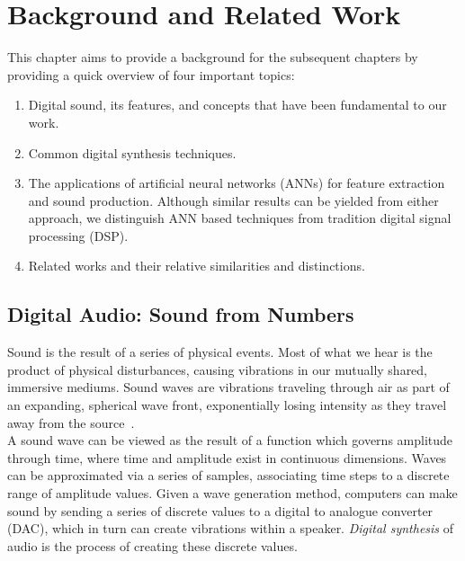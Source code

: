 \documentclass[\main/thesis.tex]{subfiles}
\begin{document}
\chapter{Background and Related Work}
\label{section:background}
This chapter aims to provide a background for the subsequent chapters by providing a quick overview of four important topics:\\ 
\begin{enumerate}[label=(\roman*)]
\item Digital sound, its features, and concepts that have been fundamental to our work.
\item Common digital synthesis techniques.
\item The applications of artificial neural networks (ANNs) for feature extraction and sound production. Although similar results can be yielded from either approach, we distinguish ANN based techniques from tradition digital signal processing (DSP).
\item Related works and their relative similarities and distinctions.
\end{enumerate}
\section{Digital Audio: Sound from Numbers}
\label{sec:digital_audio}
Sound is the result of a series of physical events. Most of what we hear is the product of physical disturbances, causing vibrations in our mutually shared, immersive mediums. Sound waves are vibrations traveling through air as part of an expanding, spherical wave front, exponentially losing intensity as they travel away from the source~\cite{cook1999chap4}. 
\\

A sound wave can be viewed as the result of a function which governs amplitude through time, where time and amplitude exist in continuous dimensions. Waves can be approximated via a series of samples, associating time steps to a discrete range of amplitude values. 
Given a wave generation method, computers can make sound by sending a series of discrete values to a digital to analogue converter (DAC), which in turn can
create vibrations within a speaker.  \textit{Digital synthesis} of audio is the process of creating these discrete values. 
\\
\end{document}
